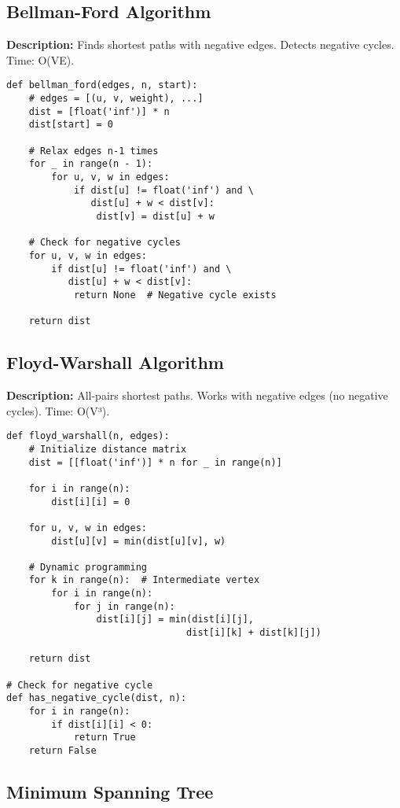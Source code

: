 \subsection{Bellman-Ford Algorithm}
\textbf{Description:} Finds shortest paths with negative edges. Detects negative cycles. Time: O(VE).

\begin{lstlisting}
def bellman_ford(edges, n, start):
    # edges = [(u, v, weight), ...]
    dist = [float('inf')] * n
    dist[start] = 0
    
    # Relax edges n-1 times
    for _ in range(n - 1):
        for u, v, w in edges:
            if dist[u] != float('inf') and \
               dist[u] + w < dist[v]:
                dist[v] = dist[u] + w
    
    # Check for negative cycles
    for u, v, w in edges:
        if dist[u] != float('inf') and \
           dist[u] + w < dist[v]:
            return None  # Negative cycle exists
    
    return dist
\end{lstlisting}

\subsection{Floyd-Warshall Algorithm}
\textbf{Description:} All-pairs shortest paths. Works with negative edges (no negative cycles). Time: O(V³).

\begin{lstlisting}
def floyd_warshall(n, edges):
    # Initialize distance matrix
    dist = [[float('inf')] * n for _ in range(n)]
    
    for i in range(n):
        dist[i][i] = 0
    
    for u, v, w in edges:
        dist[u][v] = min(dist[u][v], w)
    
    # Dynamic programming
    for k in range(n):  # Intermediate vertex
        for i in range(n):
            for j in range(n):
                dist[i][j] = min(dist[i][j], 
                                dist[i][k] + dist[k][j])
    
    return dist

# Check for negative cycle
def has_negative_cycle(dist, n):
    for i in range(n):
        if dist[i][i] < 0:
            return True
    return False
\end{lstlisting}

\subsection{Minimum Spanning Tree}

